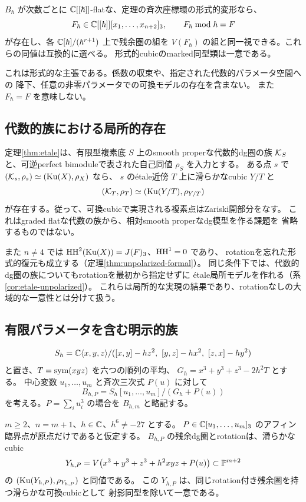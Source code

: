 \begin{corollary}[形式族]\label{cor:formal}
 \(B_\hbar\) が次数ごとに \(\mathbb C[[\hbar]]\)-flatな、定理の斉次座標環の形式的変形なら、
 \[
 F_\hbar\in\mathbb C[[\hbar]][x_1,\ldots,x_{n+2}]_3,\qquad F_\hbar\bmod\hbar=F
 \]
 が存在し、各 \(\mathbb C[\hbar]/(\hbar^{r+1})\) 上で残余圏の組を
 \(V(F_\hbar)\) の組と同一視できる。これらの同値は互換的に選べる。
 形式的cubicのmarked同型類は一意である。
\end{corollary}

これは形式的な主張である。係数の収束や、指定された代数的パラメータ空間への
降下、任意の非零パラメータでの可換モデルの存在を含まない。
また \(F_\hbar=F\) を意味しない。

\subsection{代数的族における局所的存在}

定理\ref{thm:etale}は、有限型複素底 \(S\) 上のsmooth properな代数的dg圏の族
\(\mathcal K_S\) と、可逆perfect bimoduleで表された自己同値 \(\rho_S\) を入力とする。
ある点 \(s\) で \((\mathcal K_s,\rho_s)\simeq(\operatorname{Ku}(X),\rho_X)\) なら、
\(s\) のétale近傍 \(T\) 上に滑らかなcubic \(Y/T\) と
\[
 (\mathcal K_T,\rho_T)\simeq(\operatorname{Ku}(Y/T),\rho_{Y/T})
\]
が存在する。従って、可換cubicで実現される複素点はZariski開部分をなす。
これはgraded flatな代数の族から、相対smooth properなdg模型を作る課題を
省略するものではない。

また \(n\ne4\) では \(\operatorname{HH}^2(\operatorname{Ku}(X))=J(F)_3\)、\(\operatorname{HH}^1=0\) であり、
rotationを忘れた形式的復元も成立する（定理\ref{thm:unpolarized-formal}）。
同じ条件下では、代数的dg圏の族についてもrotationを最初から指定せずに
étale局所モデルを作れる（系\ref{cor:etale-unpolarized}）。
これらは局所的な実現の結果であり、rotationなしの大域的な一意性とは分けて扱う。

\subsection{有限パラメータを含む明示的族}

\[
 S_h=\mathbb C\langle x,y,z\rangle/
 ([x,y]-hz^2,\ [y,z]-hx^2,\ [z,x]-hy^2)
\]
と置き、\(T=\operatorname{sym}(xyz)\) を六つの順列の平均、
\(G_h=x^3+y^3+z^3-2h^2T\) とする。
中心変数 \(u_1,\ldots,u_m\) と斉次三次式 \(P(u)\) に対して
\[
 B_{h,P}=S_h[u_1,\ldots,u_m]/(G_h+P(u))
\]
を考える。\(P=\sum_i u_i^3\) の場合を \(B_{h,m}\) と略記する。

\begin{theorem}[一ブロックと任意の中心三次式の可換モデル]\label{thm:global}
 \(m\ge2\)、\(n=m+1\)、\(h\in\mathbb C\)、\(h^6\ne-27\) とする。
 \(P\in\mathbb C[u_1,\ldots,u_m]_3\) のアフィン臨界点が原点だけであると仮定する。
 \(B_{h,P}\) の残余dg圏とrotationは、滑らかなcubic
 \[
 Y_{h,P}=V\!\left(x^3+y^3+z^3+h^2xyz+P(u)\right)
 \subset\mathbb P^{m+2}
 \]
 の \((\operatorname{Ku}(Y_{h,P}),\rho_{Y_{h,P}})\) と同値である。
 この \(Y_{h,P}\) は、同じrotation付き残余圏を持つ滑らかな可換cubicとして
 射影同型を除いて一意である。
\end{theorem}

